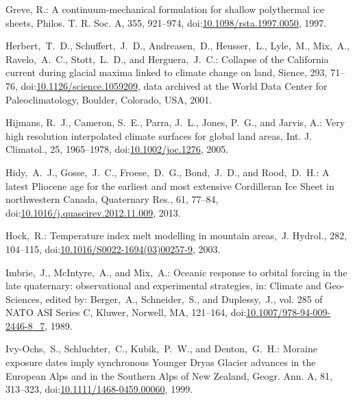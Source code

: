 \documentclass[tc, manuscript]{copernicus}
\begin{document}
\begin{thebibliography}{114}
Greve, R.: A continuum-mechanical formulation for shallow polythermal ice sheets, Philos. T. R. Soc. A, 355, 921--974,
doi:\href{http://dx.doi.org/10.1098/rsta.1997.0050}{10.1098/rsta.1997.0050}, 1997.


Herbert,~T.~D., Schuffert,~J.~D., Andreasen,~D., Heusser,~L., Lyle,~M., Mix,~A., Ravelo,~A.~C., Stott,~L.~D., and Herguera,~J.~C.: Collapse of the California current during glacial maxima linked to climate change on land, Sience, 293, 71--76,
doi:\href{http://dx.doi.org/10.1126/science.1059209}{10.1126/science.1059209}, data archived at the World Data Center for Paleoclimatology, Boulder, Colorado, USA, 2001.


Hijmans, R.~J., Cameron, S.~E., Parra, J.~L., Jones, P.~G., and Jarvis, A.: Very high resolution interpolated climate surfaces for global land areas, Int. J. Climatol., 25, 1965--1978,
doi:\href{http://dx.doi.org/10.1002/joc.1276}{10.1002/joc.1276}, 2005.


Hidy,~A.~J., Gosse,~J.~C., Froese,~D.~G., Bond,~J.~D., and Rood,~D.~H.: A latest Pliocene age for the earliest and most extensive Cordilleran Ice Sheet in northwestern Canada, Quaternary Res., 61, 77--84,
doi:\href{http://dx.doi.org/10.1016/j.quascirev.2012.11.009}{10.1016/j.quascirev.2012.11.009}, 2013.


Hock,~R.: Temperature index melt modelling in mountain areas,~J. Hydrol., 282, 104--115,
doi:\href{http://dx.doi.org/10.1016/S0022-1694(03)00257-9}{10.1016/S0022-1694(03)00257-9}, 2003.


Imbrie,~J., McIntyre,~A., and Mix,~A.: Oceanic response to orbital forcing in the late quaternary: observational and experimental strategies, in: Climate and Geo-Sciences, edited by: Berger,~A., Schneider,~S., and Duplessy,~J., vol. 285 of NATO ASI Series C, Kluwer, Norwell, MA, 121--164,
doi:\href{http://dx.doi.org/10.1007/978-94-009-2446-8_7}{10.1007/978-94-009-2446-8\_7}, 1989.


Ivy-Ochs,~S., Schluchter,~C., Kubik,~P.~W., and Denton,~G.~H.: Moraine
exposure dates imply synchronous Younger Dryas Glacier advances in the
European Alps and in the Southern Alps of New Zealand, Geogr. Ann. A, 81,
313--323,
doi:\href{http://dx.doi.org/10.1111/1468-0459.00060}{10.1111/1468-0459.00060},
1999.



\end{thebibliography}
\end{document}
